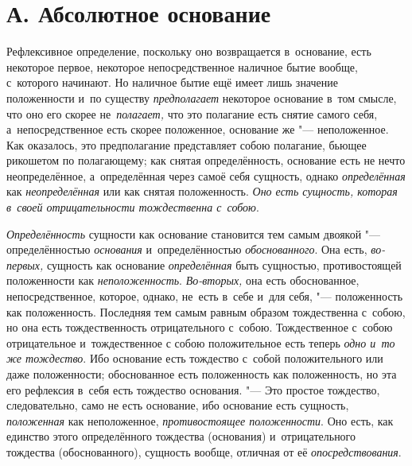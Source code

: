 \section[А. Абсолютное основание]{А. Абсолютное основание}


Рефлексивное определение, поскольку оно возвращается в~основание, есть
некоторое первое, некоторое непосредственное наличное бытие вообще, с~которого
начинают. Но наличное бытие ещё имеет лишь значение положенности и~по существу
{\em предполагает} некоторое основание в~том смысле, что оно его скорее
не~{\em полагает,} что это полагание есть снятие самого себя,
а~непосредственное есть скорее положенное, основание же "--- неположенное. Как
оказалось, это предполагание представляет собою полагание, бьющее рикошетом по
полагающему; как снятая определённость, основание есть не нечто неопределённое,
а~определённая через самоё себя сущность, однако {\em определённая}
как {\em неопределённая} или как снятая положенность.
{\em Оно есть сущность, которая в~своей отрицательности тождественна с~собою}.

{\em Определённость} сущности как основание становится тем самым двоякой "---
определённостью {\em основания} и~определённостью {\em обоснованного}. Она
есть, {\em во-первых,} сущность как основание {\em определённая} быть
сущностью, противостоящей положенности как {\em неположенность}.
{\em Во-вторых,} она есть обоснованное, непосредственное, которое, однако,
не~есть в~себе и~для себя, "--- положенность как положенность. Последняя тем
самым равным образом тождественна с~собою, но она есть тождественность
отрицательного с~собою. Тождественное с~собою отрицательное и~тождественное с
собою положительное есть теперь {\em одно и~то же тождество}. Ибо основание
есть тождество с~собой положительного или даже положенности; обоснованное есть
положенность как положенность, но эта его рефлексия в~себя есть тождество
основания. "--- Это простое тождество, следовательно, само не есть основание,
ибо основание есть сущность, {\em положенная} как неположенное,
{\em противостоящее положенности}. Оно есть, как единство этого определённого
тождества (основания) и~отрицательного тождества (обоснованного), сущность
вообще, отличная от её {\em опосредствования}.

